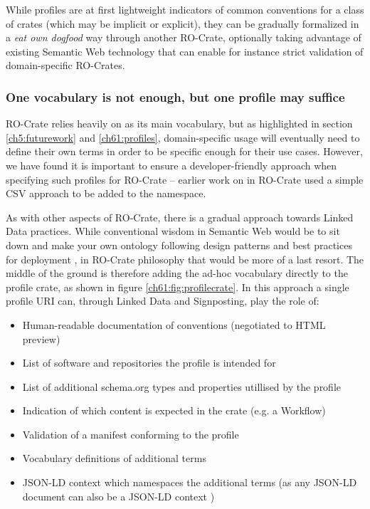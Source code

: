 While profiles are at first lightweight indicators of common conventions for a class of crates (which may be implicit or explicit), they can be gradually formalized in a \emph{eat own dogfood} way through another RO-Crate, optionally taking advantage of existing Semantic Web technology that can enable for instance strict validation of domain-specific RO-Crates.


\subsubsection{One vocabulary is not enough, but one profile may suffice}
\label{ch61:oneprofile}

RO-Crate relies heavily on \cite{schema.org} as its main vocabulary, but as highlighted in section \vref{ch5:futurework} and \vref{ch61:profiles}, domain-specific usage will eventually need to define their own terms in order to be specific enough for their use cases. However, we have found it is important to ensure a developer-friendly approach when specifying such profiles for RO-Crate -- earlier work on  in RO-Crate used a simple CSV approach to be added to the  namespace.  

As with other aspects of RO-Crate, there is a gradual approach towards Linked Data practices. While conventional wisdom in Semantic Web would be to sit down and make your own ontology following design patterns \cite{Blomquist 2009,Poveda 2010} and best practices for deployment \cite{Matentzoglu 2022}, in RO-Crate philosophy that would be more of a last resort. The middle of the ground is therefore adding the ad-hoc vocabulary directly to the profile crate, as shown in figure \vref{ch61:fig:profilecrate}. In this approach a single profile URI can, through Linked Data and Signposting, play the role of:

\begin{itemize}
  \item Human-readable documentation of conventions (negotiated to HTML preview)
  \item List of software and repositories the profile is intended for
  \item List of additional schema.org types and properties utillised by the profile
  \item Indication of which content is expected in the crate (e.g. a Workflow)
  \item Validation of a manifest conforming to the profile
  \item Vocabulary definitions of additional terms
  \item JSON-LD context which namespaces the additional terms  (as any JSON-LD document can also be a JSON-LD context \cite{w3-json-ld})
\end{itemize}

